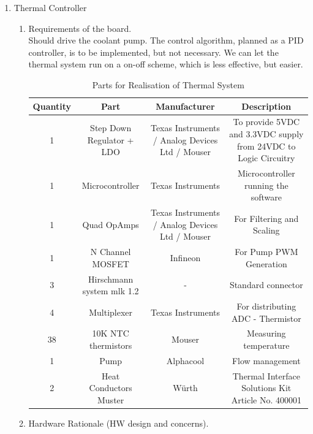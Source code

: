 \begin{enumerate}
\begin{enumerate}
    \end{enumerate}

    \item Thermal Controller
        \begin{enumerate}
            \item Requirements of the board.\\
            Should drive the coolant pump. The control algorithm, planned as a PID controller, is to be implemented, but not necessary. We can let the thermal system run on a on-off scheme, which is less effective, but easier.

          \begin{table}[H]
    \centering
    \begin{adjustbox}{width=\textwidth,center}
    \begin{tabular}{|c|c|c|c|}
        \hline
        \textbf{Quantity} & \textbf{Part} & \textbf{Manufacturer} & \textbf{Description} \\
        \hline
        1 & Step Down Regulator + LDO & Texas Instruments / Analog Devices Ltd / Mouser & To provide 5VDC and 3.3VDC supply from 24VDC to Logic Circuitry \\
        \hline
        1 & Microcontroller & Texas Instruments & Microcontroller running the software \\
        \hline
        1 & Quad OpAmps & Texas Instruments / Analog Devices Ltd / Mouser & For Filtering and Scaling \\
        \hline
        1 & N Channel MOSFET & Infineon & For Pump PWM Generation \\
        \hline
        3 & Hirschmann system mlk 1.2& -& Standard connector \\
        \hline
        4 & Multiplexer & Texas Instruments & For distributing ADC - Thermistor \\
        \hline
        38 & 10K NTC thermistors & Mouser& Measuring temperature\\
        \hline
        1& Pump& Alphacool & Flow management\\
        \hline
        2 & Heat Conductors Muster & Würth & Thermal Interface Solutions Kit Article No. 400001\\
        \hline
    \end{tabular}
    \end{adjustbox}
    \caption{Parts for Realisation of Thermal System}
    \label{tab:parts}
\end{table}
            \item Hardware Rationale (HW design and concerns).

\end{enumerate}
\end{enumerate}
